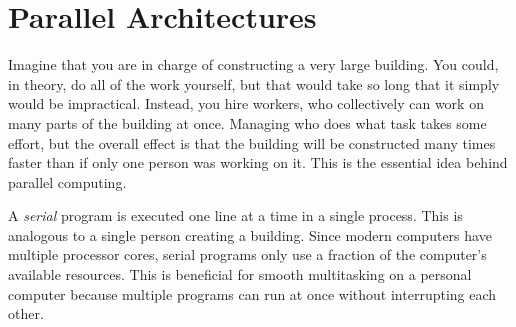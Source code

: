 
\section*{Parallel Architectures} %
Imagine that you are in charge of constructing a very large building.
You could, in theory, do all of the work yourself, but that would take so long that it simply would be impractical.
Instead, you hire workers, who collectively can work on many parts of the building at once.
Managing who does what task takes some effort, but the overall effect is that the building will be constructed many times faster than if only one person was working on it.
This is the essential idea behind parallel computing.

A \emph{serial} program is executed one line at a time in a single process.
This is analogous to a single person creating a building.
Since modern computers have multiple processor cores, serial programs only use a fraction of the computer's available resources.
This is beneficial for smooth multitasking on a personal computer because multiple programs can run at once without interrupting each other.

